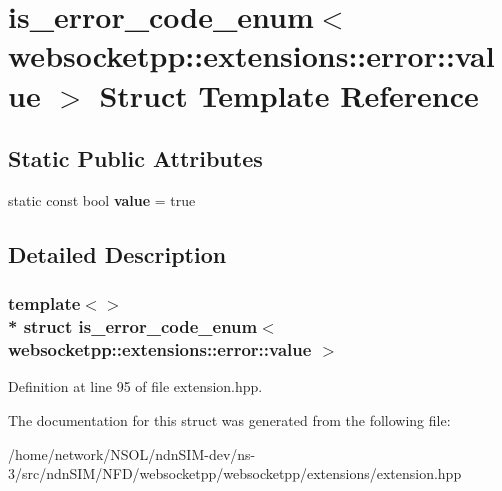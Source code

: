 \hypertarget{structis__error__code__enum_3_01websocketpp_1_1extensions_1_1error_1_1value_01_4}{}\section{is\+\_\+error\+\_\+code\+\_\+enum$<$ websocketpp\+:\+:extensions\+:\+:error\+:\+:value $>$ Struct Template Reference}
\label{structis__error__code__enum_3_01websocketpp_1_1extensions_1_1error_1_1value_01_4}
\subsection*{Static Public Attributes}
\begin{DoxyCompactItemize}
\item 
static const bool {\bfseries value} = true\hypertarget{structis__error__code__enum_3_01websocketpp_1_1extensions_1_1error_1_1value_01_4_acf8cec8e2215b469da682dc918d5d996}{}\label{structis__error__code__enum_3_01websocketpp_1_1extensions_1_1error_1_1value_01_4_acf8cec8e2215b469da682dc918d5d996}

\end{DoxyCompactItemize}


\subsection{Detailed Description}
\subsubsection*{template$<$$>$\\*
struct is\+\_\+error\+\_\+code\+\_\+enum$<$ websocketpp\+::extensions\+::error\+::value $>$}



Definition at line 95 of file extension.\+hpp.



The documentation for this struct was generated from the following file\+:\begin{DoxyCompactItemize}
\item 
/home/network/\+N\+S\+O\+L/ndn\+S\+I\+M-\/dev/ns-\/3/src/ndn\+S\+I\+M/\+N\+F\+D/websocketpp/websocketpp/extensions/extension.\+hpp\end{DoxyCompactItemize}
